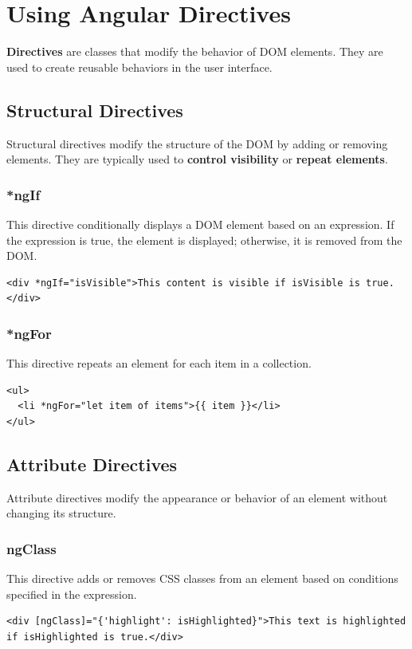 \documentclass{article}
\begin{document}
\section{Using Angular Directives}

\textbf{Directives} are classes that modify the behavior of DOM elements. They are used to create reusable behaviors in the user interface.

\subsection{Structural Directives}

Structural directives modify the structure of the DOM by adding or removing elements. They are typically used to \textbf{control visibility} or \textbf{repeat elements}.

\subsubsection{*ngIf}

This directive conditionally displays a DOM element based on an expression. If the expression is true, the element is displayed; otherwise, it is removed from the DOM.
\begin{verbatim}
<div *ngIf="isVisible">This content is visible if isVisible is true.</div>
\end{verbatim}

\subsubsection{*ngFor}

This directive repeats an element for each item in a collection.
\begin{verbatim}
<ul>
  <li *ngFor="let item of items">{{ item }}</li>
</ul>
\end{verbatim}

\subsection{Attribute Directives}

Attribute directives modify the appearance or behavior of an element without changing its structure.

\subsubsection{ngClass}

This directive adds or removes CSS classes from an element based on conditions specified in the expression.
\begin{verbatim}
<div [ngClass]="{'highlight': isHighlighted}">This text is highlighted if isHighlighted is true.</div>
\end{verbatim}
\end{document}
